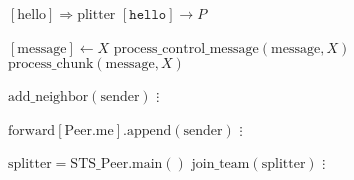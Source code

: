 \documentclass{article}
\begin{document}
\pagestyle{empty}

\newcommand{\send}{\Rightarrow}
\newcommand{\sendto}{\rightarrow}
\algrenewcommand\textproc{\textrm}

\begin{algorithmic}
  \algrenewcommand{}
  
  \State $[\text{hello}] \send \text{plitter}$
  \State $[\mathtt{hello}] \sendto P$
  \EndFor
  \EndFunction

  \State $[\text{message}] \gets X$
  \State $\text{process\_control\_message}(\text{message}, X)$
  \Else
  \State $\text{process\_chunk}(\text{message}, X)$
  \EndIf
  \EndFunction
  
  \State $\text{add\_neighbor}(\text{sender})$
  \EndIf
  \State $\vdots$
  \EndFunction

  \State $\text{forward}[\text{Peer.me}].\text{append}(\text{sender})$
  \State $\vdots$
  \EndFunction

  \State $\text{splitter}=\text{STS\_Peer.main}()$
  \State $\text{join\_team}(\text{splitter})$
  \State $\vdots$
  \EndFunction
  
  \EndProcedure
\end{algorithmic}
\end{document}
